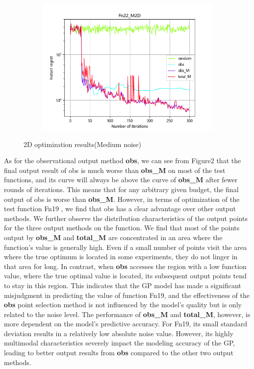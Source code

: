 \documentclass{article}
\begin{document}
\begin{figure}[H]
\begin{subfigure}[t]{.32\linewidth}
        \includegraphics[width=1\textwidth]{pictures/Homo_noise_2D/M/Fn22_M2D_ins.png}
    \end{subfigure}
    \caption{2D optimization results(Medium noise)}
    \label{Fig3}
\end{figure}

\hspace{2em}As for the observational output method \textbf{obs}, we can see from Figure2 that the final output result of obs is much worse than \textbf{obs\_M} on most of the test functions, and its curve will always be above the curve of \textbf{obs\_M} after fewer rounds of iterations. This means that for any arbitrary given budget, the final output of obs is worse than \textbf{obs\_M}. However, in terms of optimization of the test function Fn19 , we find that obs has a clear advantage over other output methods. We further observe the distribution characteristics of the output points for the three output methods on the function. We find that most of the points output by \textbf{obs\_M} and \textbf{total\_M} are concentrated in an area where the function's value is generally high. Even if a small number of points visit the area where the true optimum is located in some experiments, they do not linger in that area for long. In contrast, when \textbf{obs} accesses the region with a low function value, where the true optimal value is located, its subsequent output points tend to stay in this region. This indicates that the GP model has made a significant misjudgment in predicting the value of function Fn19, and the effectiveness of the \textbf{obs} point selection method is not influenced by the model's quality but is only related to the noise level. The performance of \textbf{obs\_M} and \textbf{total\_M}, however, is more dependent on the model's predictive accuracy. For Fn19, its small standard deviation results in a relatively low absolute noise value. However, its highly multimodal characteristics severely impact the modeling accuracy of the GP, leading to better output results from \textbf{obs} compared to the other two output methods.
\end{document}
